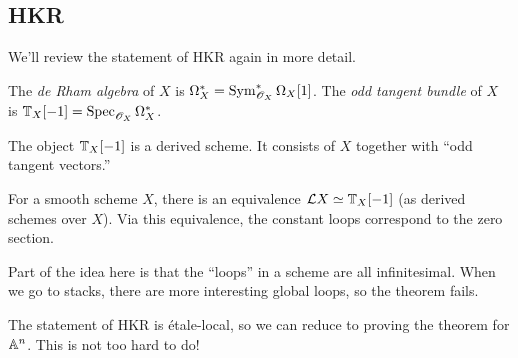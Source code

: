 \documentclass{article}
\begin{document}
\subsection{HKR}

We'll review the statement of HKR again in more detail.

\begin{dfn}
  The \emph{de Rham algebra} of $X$ is $\Omega^*_X = \Sym^*_{\Osc_X} \Omega_X[1]$.
  The \emph{odd tangent bundle} of $X$ is $\TT_X[-1] = \Spec_{\Osc_X} \Omega^*_X$.
\end{dfn}

The object $\TT_X[-1]$ is a derived scheme.
It consists of $X$ together with ``odd tangent vectors.''

\begin{thm}
  For a smooth scheme $X$, there is an equivalence $\Lc X \simeq \TT_X[-1]$ (as derived schemes over $X$).
  Via this equivalence, the constant loops correspond to the zero section.
\end{thm}

Part of the idea here is that the ``loops'' in a scheme are all infinitesimal.
When we go to stacks, there are more interesting global loops, so the theorem fails.

The statement of HKR is \'etale-local, so we can reduce to proving the theorem for $\AA^n$.
This is not too hard to do!
\end{document}
